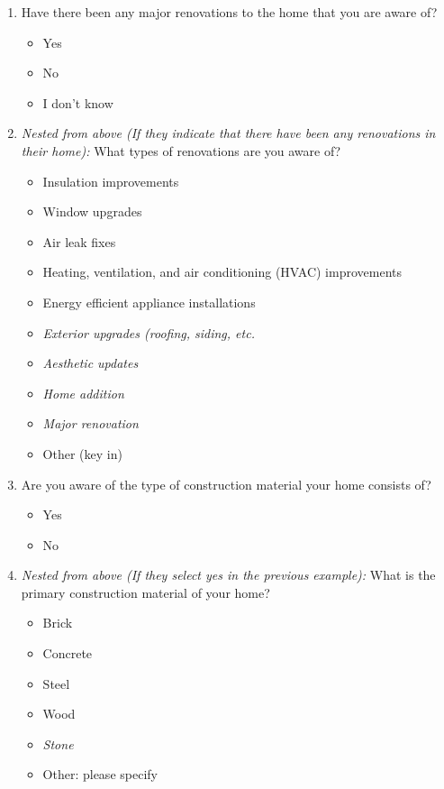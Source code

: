\documentclass{article}
\begin{document}
\begin{enumerate}
\item Have there been any major renovations to the home that you are aware of?
\begin{itemize}
  \item[\checkbox] Yes
  \item[\checkbox] No
  \item[\checkbox] I don't know
\end{itemize}
 

\item \textit{Nested from above (If they indicate that there have been any renovations in their home):}
What types of renovations are you aware of?
\begin{itemize}
  \item[\checkbox] Insulation improvements
  \item[\checkbox] Window upgrades
  \item[\checkbox] Air leak fixes
  \item[\checkbox] Heating, ventilation, and air conditioning (HVAC) improvements
  \item[\checkbox] Energy efficient appliance installations
  \item[\checkbox] \textit{Exterior upgrades (roofing, siding, etc.}
  \item[\checkbox] \textit{Aesthetic updates}
  \item[\checkbox] \textit{Home addition}
  \item[\checkbox] \textit{Major renovation}
  \item[\checkbox] Other (key in)
\end{itemize}
 

\item Are you aware of the type of construction material your home consists of?
\begin{itemize}
  \item[\checkbox] Yes
  \item[\checkbox] No
\end{itemize}
 

\item \textit{Nested from above (If they select yes in the previous example):}
What is the primary construction material of your home?
\begin{itemize}
  \item[\checkbox] Brick
  \item[\checkbox] Concrete
  \item[\checkbox] Steel
  \item[\checkbox] Wood
  \item[\checkbox] \textit{Stone}
  \item[\checkbox] Other: please specify
\end{itemize}
 


\end{enumerate}
\end{document}
